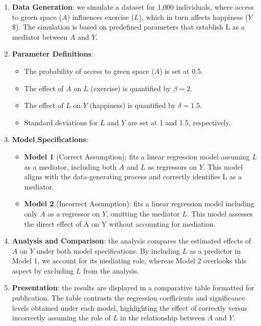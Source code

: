 \documentclass[
  singlecolumn]{article}
\providecommand{\tightlist}{%
  \setlength{\itemsep}{0pt}\setlength{\parskip}{0pt}}\usepackage{longtable,booktabs,array}
\begin{document}
\begin{enumerate}
\def\labelenumi{\arabic{enumi}.}
\item
  \textbf{Data Generation}: we simulate a dataset for 1,000 individuals,
  where access to green space (\(A\)) influences exercise (\(L\)), which
  in turn affects happiness (\(Y\)\$). The simulation is based on
  predefined parameters that establish L as a mediator between \(A\) and
  \(Y\).
\item
  \textbf{Parameter Definitions}:

  \begin{itemize}
  \tightlist
  \item
    The probability of access to green space (\(A\)) is set at 0.5.
  \item
    The effect of \(A\) on \(L\) (exercise) is quantified by
    \(\beta = 2\).
  \item
    The effect of \(L\) on \(Y\) (happiness) is quantified by
    \(\delta = 1.5\).
  \item
    Standard deviations for \(L\) and \(Y\) are set at 1 and 1.5,
    respectively.
  \end{itemize}
\item
  \textbf{Model Specifications}:

  \begin{itemize}
  \tightlist
  \item
    \textbf{Model 1} (Correct Assumption): fits a linear regression
    model assuming \(L\) as a mediator, including both \(A\) and \(L\)
    as regressors on \(Y\). This model aligns with the data-generating
    process and correctly identifies L as a mediator.
  \item
    \textbf{Model 2} (Incorrect Assumption): fits a linear regression
    model including only \(A\) as a regressor on \(Y\), omitting the
    mediator \(L\). This model assesses the direct effect of A on Y
    without accounting for mediation.
  \end{itemize}
\item
  \textbf{Analysis and Comparison}: the analysis compares the estimated
  effects of \(A\) on \(Y\) under both model specifications. By
  including \(L\) as a predictor in Model 1, we account for its
  mediating role, whereas Model 2 overlooks this aspect by excluding
  \(L\) from the analysis.
\item
  \textbf{Presentation}: the results are displayed in a comparative
  table formatted for publication. The table contrasts the regression
  coefficients and significance levels obtained under each model,
  highlighting the effect of correctly versus incorrectly assuming the
  role of \(L\) in the relationship between \(A\) and \(Y\).
\end{enumerate}
\end{document}
